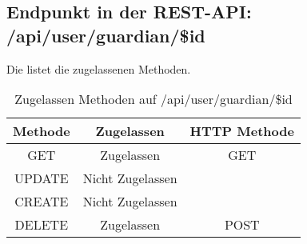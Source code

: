 \subsection{Endpunkt in der REST-API: /api/user/guardian/\$id}
Die  listet die zugelassenen Methoden. 

\begin{table}[!htbp]
	\begin{tabular}{|c|c|c|}
		\hline
			\textbf{Methode} & \textbf{Zugelassen} & \textbf{HTTP Methode} \\ \hline
			GET & Zugelassen & GET \\ \hline
			UPDATE & Nicht Zugelassen & \\ \hline 
			CREATE & Nicht Zugelassen & \\ \hline 
			DELETE & Zugelassen & POST \\ \hline
	\end{tabular}

		\caption{Zugelassen Methoden auf /api/user/guardian/\$id}
		\label{tab:end:rest:api:user:guardian:id:meth}
\end{table}